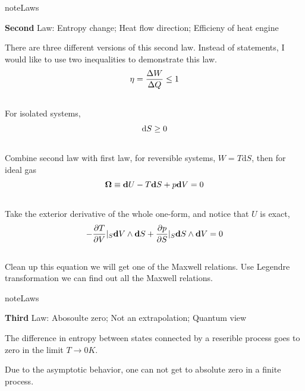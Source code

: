 \documentclass[letterpaper,10pt,english]{sphinxmanual}
\begin{document}
\begin{notice}{note}{Laws}

\textbf{Second} Law: Entropy change; Heat flow direction; Efficieny of heat engine

There are three different versions of this second law. Instead of statements, I would like to use two inequalities to demonstrate this law.
\begin{gather}
\begin{split}\eta = \frac{\Delta W}{\Delta Q} \le 1\end{split}\notag\\\begin{split}\end{split}\notag
\end{gather}
For isolated systems,
\begin{gather}
\begin{split}\mathrm d S \ge 0\end{split}\notag\\\begin{split}\end{split}\notag
\end{gather}
Combine second law with first law, for reversible systems, $W = T\mathbf {\mathrm d} S$, then for ideal gas
\begin{gather}
\begin{split}\mathbf\Omega \equiv \mathbf d U  - T \mathbf  d S + p \mathbf d V =0\end{split}\notag\\\begin{split}\end{split}\notag
\end{gather}
Take the exterior derivative of the whole one-form, and notice that $U$ is exact,
\begin{gather}
\begin{split}-\frac{\partial T}{\partial V}\vert_S \mathbf d V \wedge \mathbf d S + \frac{\partial p}{\partial S}\vert_S \mathbf d S \wedge \mathbf d V = 0\end{split}\notag\\\begin{split}\end{split}\notag
\end{gather}
Clean up this equation we will get one of the Maxwell relations. Use Legendre transformation we can find out all the Maxwell relations.
\end{notice}

\begin{notice}{note}{Laws}

\textbf{Third} Law: Abosoulte zero; Not an extrapolation; Quantum view

The difference in entropy between states connected by a reserible process goes to zero in the limit $T\rightarrow 0 K$.

Due to the asymptotic behavior, one can not get to absolute zero in a finite process.
\end{notice}
\end{document}

